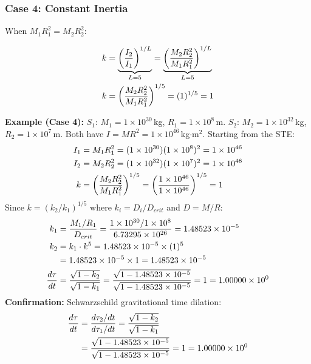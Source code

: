 \subsubsection*{Case 4: Constant Inertia}

When $M_1 R_1^2 = M_2 R_2^2$:

\begin{align}
k &= \underbrace{\left(\frac{I_2}{I_1}\right)^{1/L}}_{L=5} = \underbrace{\left(\frac{M_2 R_2^2}{M_1 R_1^2}\right)^{1/L}}_{L=5} \notag \\
k &= \left(\frac{M_2 R_2^2}{M_1 R_1^2}\right)^{1/5} = (1)^{1/5} = 1
\end{align}

\begin{mdframed}
\textbf{Example (Case 4):} $S_1$: $M_1 = 1 \times 10^{30}$\,kg, $R_1 = 1 \times 10^{8}$\,m. $S_2$: $M_2 = 1 \times 10^{32}$\,kg, $R_2 = 1 \times 10^{7}$\,m. Both have $I = MR^2 = 1 \times 10^{46}$\,kg$\cdot$m$^2$. Starting from the STE:
\begin{align}
I_1 &= M_1 R_1^2 = (1 \times 10^{30})(1 \times 10^{8})^2 = 1 \times 10^{46} \notag \\
I_2 &= M_2 R_2^2 = (1 \times 10^{32})(1 \times 10^{7})^2 = 1 \times 10^{46} \notag \\
k &= \left(\frac{M_2 R_2^2}{M_1 R_1^2}\right)^{1/5}
= \left(\frac{1 \times 10^{46}}{1 \times 10^{46}}\right)^{1/5}
= 1 \notag
\end{align}
Since $k = (k_2/k_1)^{1/5}$ where $k_i = D_i/D_{crit}$ and $D = M/R$:
\begin{align}
k_1 &= \frac{M_1/R_1}{D_{crit}}
= \frac{1 \times 10^{30}/1 \times 10^{8}}{6.73295 \times 10^{26}}
= 1.48523 \times 10^{-5} \notag \\
k_2 &= k_1 \cdot k^5
= 1.48523 \times 10^{-5} \times (1)^5 \notag \\
&= 1.48523 \times 10^{-5} \times 1
= 1.48523 \times 10^{-5} \notag \\
\frac{d\tau}{dt} &= \frac{\sqrt{1 - k_2}}{\sqrt{1 - k_1}}
= \frac{\sqrt{1 - 1.48523 \times 10^{-5}}}{\sqrt{1 - 1.48523 \times 10^{-5}}}
= 1
= 1.00000 \times 10^{0} \notag
\end{align}
\textbf{Confirmation:} Schwarzschild gravitational time dilation:
\begin{align}
\frac{d\tau}{dt} &= \frac{d\tau_2 / dt}{d\tau_1 / dt}
= \frac{\sqrt{1 - k_2}}{\sqrt{1 - k_1}} \notag \\
&= \frac{\sqrt{1 - 1.48523 \times 10^{-5}}}{\sqrt{1 - 1.48523 \times 10^{-5}}}
= 1
= 1.00000 \times 10^{0} \notag
\end{align}
\end{mdframed}

